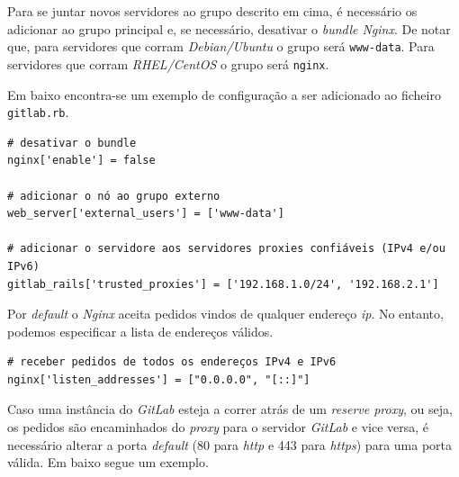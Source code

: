 \documentclass[12pt,a4paper]{article}
\begin{document}
Para se juntar novos servidores ao grupo descrito em cima, é necessário os adicionar ao grupo principal e, se necessário, desativar o \emph{bundle Nginx}. De notar que, para servidores que corram \emph{Debian/Ubuntu} o grupo será \texttt{www-data}. Para servidores que corram \emph{RHEL/CentOS} o grupo será \texttt{nginx}.

Em baixo encontra-se um exemplo de configuração a ser adicionado ao ficheiro \texttt{gitlab.rb}.

\begin{verbatim}
# desativar o bundle
nginx['enable'] = false

# adicionar o nó ao grupo externo
web_server['external_users'] = ['www-data']

# adicionar o servidore aos servidores proxies confiáveis (IPv4 e/ou IPv6)
gitlab_rails['trusted_proxies'] = ['192.168.1.0/24', '192.168.2.1']
\end{verbatim}

Por \emph{default} o \emph{Nginx} aceita pedidos vindos de qualquer endereço \emph{ip}. No entanto, podemos especificar a lista de endereços válidos.

\begin{verbatim}
# receber pedidos de todos os endereços IPv4 e IPv6
nginx['listen_addresses'] = ["0.0.0.0", "[::]"] 
\end{verbatim}

Caso uma instância do \emph{GitLab} esteja a correr atrás de um \emph{reserve proxy}, ou seja, os pedidos são encaminhados do \emph{proxy} para o servidor \emph{GitLab} e vice versa, é necessário alterar a porta \emph{default} (80 para \emph{http} e 443 para \emph{https}) para uma porta válida. Em baixo segue um exemplo.
\end{document}
